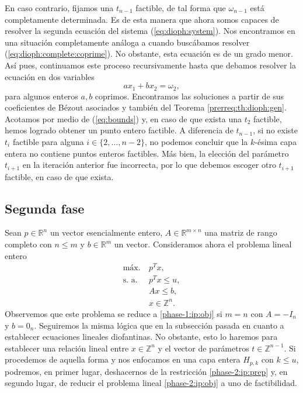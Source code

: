 \documentclass[11pt]{article}
\begin{document}
En caso contrario, fijamos una $t_{n-1}$ factible, de tal forma que $\omega_{n-1}$ está
completamente determinada. Es de esta manera que ahora somos capaces de resolver la segunda ecuación
del sistema (\ref{eq:dioph:system}). Nos encontramos en una situación completamente análoga a cuando
buscábamos resolver (\ref{eq:dioph:complete:coprime}). No obstante, esta ecuación es de un grado
menor. Así pues, continuamos este proceso recursivamente hasta que debamos
resolver la ecuación en dos variables
\begin{equation*}
	ax_1 + bx_2 = \omega_2,
\end{equation*}
para algunos enteros $a, b$ coprimos. Encontramos las soluciones a partir de sus coeficientes de
Bézout asociados y también del Teorema \ref{prerreq:th:dioph:gen}. Acotamos por medio de (\ref{eq:bounds})
y, en caso de que exista una $t_2$ factible, hemos logrado obtener un punto entero factible. A
diferencia de $t_{n - 1}$, si no existe $t_i$ factible para alguna $i \in \{2, \ldots, n - 2\}$, no
podemos concluir que la $k$-ésima capa entera no contiene puntos enteros factibles. Más bien, la
elección del parámetro $t_{i + 1}$ en la iteración anterior fue incorrecta, por lo que debemos
escoger otro $t_{i + 1}$ factible, en caso de que exista.


\subsection*{Segunda fase}
Sean $p \in \mathbb{R}^n$ un vector esencialmente entero, $A \in \mathbb{R}^{m \times n}$ una matriz
de rango completo con $n \leq m$ y $b \in \mathbb{R}^m$ un vector. Consideramos ahora el problema
lineal entero
\begin{align}
	\text{máx.} ~& p^Tx, \label{phase-2:ip:obj} \\
	\text{s. a.} ~& p^Tx \leq u, \label{phase-2:ip:prep} \\
				  & Ax \leq b, \label{phase-2:ip:rest} \\
				  & x \in \mathbb{Z}^n.
\end{align}
Observemos que este problema se reduce a \ref{phase-1:ip:obj} si $m = n$ con $A = -I_n$ y $b = 0_n$.
Seguiremos la misma lógica que en la subsección pasada en cuanto a establecer ecuaciones lineales
diofantinas. No obstante, esto lo haremos para establecer una relación lineal entre $x \in
\mathbb{Z}^n$ y el vector de parámetros $t \in \mathbb{Z}^{n-1}$. Si procedemos de aquella forma y
nos enfocamos en una capa entera $H_{p, k}$ con $k \leq u$, podremos, en primer lugar, deshacernos
de la restricción \ref{phase-2:ip:prep} y, en segundo lugar, de reducir el problema lineal
\ref{phase-2:ip:obj} a uno de factibilidad.
\end{document}
